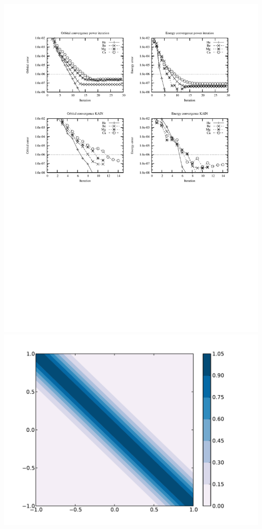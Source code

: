 \documentclass [a4paper, landscape]{report}
\begin{document}
\includegraphics[scale=0.1, clip, viewport = 100 000 370 262]{../accuracy.pdf}
\includegraphics[scale=0.1, clip, viewport = 100 100 370 362]{sparsematrix.pdf}
\end{document}
